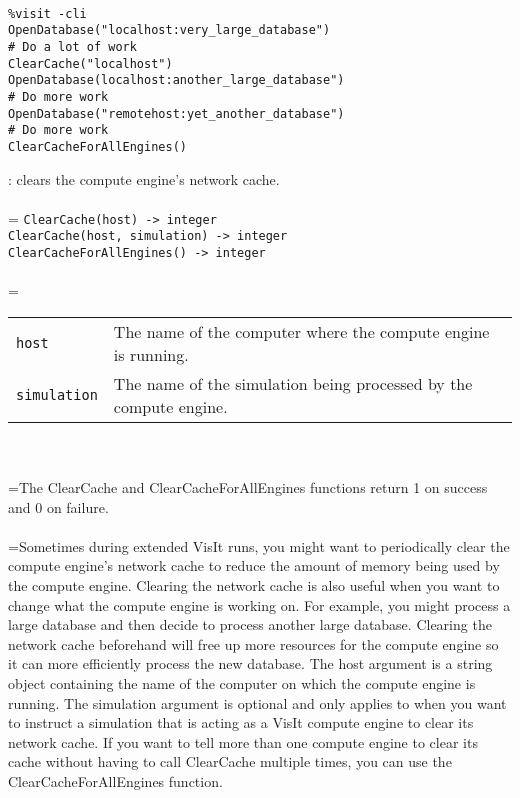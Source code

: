 \documentclass[10pt,a4paper]{report}
\begin{document}
\\[-6mm]
\begin{verbatim}%visit -cli
OpenDatabase("localhost:very_large_database")
# Do a lot of work
ClearCache("localhost")
OpenDatabase(localhost:another_large_database")
# Do more work
OpenDatabase("remotehost:yet_another_database")
# Do more work
ClearCacheForAllEngines()
\end{verbatim}
\newpage


{}
: clears the compute engine's network cache.\\[-3mm]

 \\ 
\hangindent=\parindent 
\verb!ClearCache(host) -> integer!\\ 
\verb!ClearCache(host, simulation) -> integer!\\ 
\verb!ClearCacheForAllEngines() -> integer!\\ [-3mm]

 \\ 
\hangindent=\parindent 
\begin{tabular}{lp{9cm}}
\verb!host! & The name of the computer where the compute engine is running. \\
\verb!simulation! & The name of the simulation being processed by the compute engine. \\
\end{tabular} \\[-2mm]


 \\ 
\hangindent=\parindent The ClearCache and ClearCacheForAllEngines functions return 1 on success and 0 on failure. \\[-3mm] 

 \\ 
\hangindent=\parindent Sometimes during extended VisIt runs, you might want to periodically clear the compute engine's network cache to reduce the amount of memory being used by the compute engine. Clearing the network cache is also useful when you want to change what the compute engine is working on. For example, you might process a large database and then decide to process another large database. Clearing the network cache beforehand will free up more resources for the compute engine so it can more efficiently process the new database. The host argument is a string object containing the name of the computer on which the compute engine is running. The simulation argument is optional and only applies to when you want to instruct a simulation that is acting as a VisIt compute engine to clear its network cache. If you want to tell more than one compute engine to clear its cache without having to call ClearCache multiple times, you can use the ClearCacheForAllEngines function. \\[-3mm] 
\end{document}
